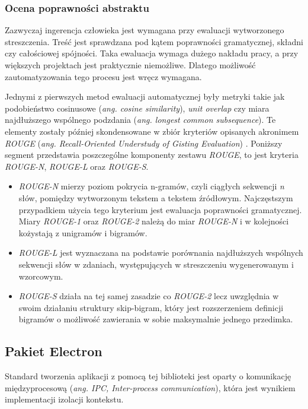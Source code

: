 \documentclass[12pt,a4paper,twoside]{article}
\begin{document}
\subsubsection{Ocena poprawności abstraktu}
Zazwyczaj ingerencja człowieka jest wymagana przy ewaluacji wytworzonego streszczenia. Treść jest sprawdzana pod kątem poprawności gramatycznej, składni czy całościowej spójności. Taka ewaluacja wymaga dużego nakładu pracy, a przy większych projektach jest praktycznie niemożliwe. Dlatego możliwość zautomatyzowania tego procesu jest wręcz wymagana.\par
Jednymi z pierwszych metod ewaluacji automatycznej były metryki takie jak podobieństwo cosinusowe (\textit{ang. cosine similarity}), \textit{unit overlap} czy miara najdłuższego wspólnego podzdania (\textit{ang. longest common subsequence}). Te elementy zostały później skondensowane w zbiór kryteriów opisanych akronimem \textit{ROUGE} (\textit{ang. Recall-Oriented Understudy of Gisting Evaluation}) \cite{rouge}. Poniższy segment przedstawia poszczególne komponenty zestawu \textit{ROUGE}, to jest kryteria \textit{ROUGE-N}, \textit{ROUGE-L} oraz \textit{ROUGE-S}.\par
\begin{itemize}
	\item \textit{ROUGE-N} mierzy poziom pokrycia n-gramów, czyli ciągłych sekwencji \textit{n} słów, pomiędzy wytworzonym tekstem a tekstem źródłowym. Najczęstszym przypadkiem użycia tego kryterium jest ewaluacja poprawności gramatycznej. Miary \textit{ROUGE-1} oraz \textit{ROUGE-2} należą do miar \textit{ROUGE-N} i w kolejności kożystają z unigramów i bigramów.
	\item \textit{ROUGE-L} jest wyznaczana na podstawie porównania najdłuższych wspólnych sekwencji słów w zdaniach, występujących w streszczeniu wygenerowanym i wzorcowym. 
	\item \textit{ROUGE-S} działa na tej samej zasadzie co \textit{ROUGE-2} lecz uwzględnia w swoim działaniu struktury skip-bigram, który jest rozszerzeniem definicji bigramów o możliwość zawierania w sobie maksymalnie jednego przedimka.
\end{itemize}
\subsection{Pakiet Electron}
Standard tworzenia aplikacji z pomocą tej biblioteki jest oparty o komunikację międzyprocesową (\textit{ang. IPC, Inter-process communication}), która jest wynikiem implementacji izolacji kontekstu. 
\end{document}

